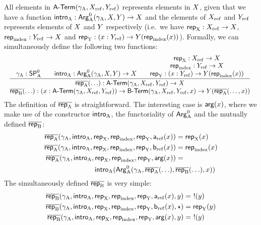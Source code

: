 \documentclass{schwicht}
\begin{document}
All elements in $\Aterm(\gammaA,\Xref, \Yref)$ represents elements in
$\A$, given that we have a function $\introA : \ArgAp(\gammaA, \A, \B) \to
\A$ and the elements of $\Xref$ and $\Yref$ represents elements of $\A$
and $\B$ respectively (i.e.\ we have $\repA : \Xref \to \A$, $\repIndex
: \Yref \to \A$ and $\repB : (x : \Yref) \to \B(\repIndex(x))$).
Formally, we can simultaneously define the following two functions:
%
\[ 
\resizebox{\textwidth}{!}{%
$
\infer{\deduce{\repBbar(\ldots) : (x : \Aterm(\gammaA, \Xref, \Yref)) \to \Bterm(\gammaA, \Xref, \Yref, x) \to \B(\repAbar(\ldots, x))}
              {\repAbar(\ldots) : \Aterm(\gammaA, \Xref, \Yref) \to \A}}
      {\gammaA : \SPAp & \quad
       \introA : \ArgAp(\gammaA, \A, \B) \to \A & \quad
       \deduce{\repB : (x : \Yref) \to \B(\repIndex(x))}
              {\deduce{\repIndex : \Yref \to \A}
                      {\repA : \Xref \to \A}}}
$
}
\]
%
The definition of $\repAbar$ is straightforward. The interesting case
is $\termArg(x)$, where we make use of the constructor $\introA$, the
functoriality of $\ArgAp$ and the mutually defined $\repBbar$:
\begin{align*}
  \repAbar(\gammaA, \introA, \repA, \repIndex, \repB, \termAref(x)) &= \repA(x) \\
  \repAbar(\gammaA, \introA, \repA, \repIndex, \repB, \termBref(x)) &= \repIndex(x) \\
  \repAbar(\gammaA, \introA, \repA, \repIndex, \repB, \termArg(x)) &= \\
\multispan{2}{\hfill $\introA(\ArgAp(\gammaA, \repAbar(\ldots), \repBbar(\ldots), x))$}
\end{align*}
%
The simultaneously defined $\repBbar$ is very simple:
%
\begin{align*}
  \repBbar(\gammaA, \introA, \repA, \repIndex, \repB, \termAref(x), y) &=\ \magicOmit{\B \circ \repAbar(\ldots)}(y) \\
\repBbar(\gammaA, \introA, \repA, \repIndex, \repB, \termBref(x), \oneelt) &= \repB(y) \\
\repBbar(\gammaA, \introA, \repA, \repIndex, \repB, \termArg(x), y) &=\ \magicOmit{\B \circ \repAbar(\ldots)}(y) \\ \\
\end{align*}
\end{document}
